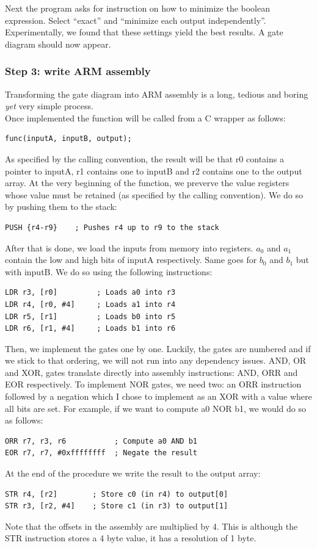 \documentclass{report}
\begin{document}
Next the program asks for instruction on how to minimize the boolean expression. Select ``exact'' and ``minimize each output independently''. Experimentally, we found that these settings yield the best results. A gate diagram should now appear.

\subsubsection*{Step 3: write ARM assembly}
Transforming the gate diagram into ARM assembly is a long, tedious and boring \textit{yet} very simple process.\\
Once implemented the function will be called from a C wrapper as follows:
\begin{verbatim}
func(inputA, inputB, output);
\end{verbatim}
\newpage
As specified by the calling convention, the result will be that r0 contains a pointer to inputA, r1 contains one to inputB and r2 contains one to the output array.
At the very beginning of the function, we preverve the value registers whose value must be retained (as specified by the calling convention). We do so by pushing them to the stack:
\begin{verbatim}
PUSH {r4-r9}    ; Pushes r4 up to r9 to the stack
\end{verbatim}
After that is done, we load the inputs from memory into registers. $a_0$ and $a_1$ contain the low and high bits of inputA respectively. Same goes for $b_0$ and $b_1$ but with inputB. We do so using the following instructions:
\begin{verbatim}
LDR r3, [r0]         ; Loads a0 into r3
LDR r4, [r0, #4]     ; Loads a1 into r4 
LDR r5, [r1]         ; Loads b0 into r5
LDR r6, [r1, #4]     ; Loads b1 into r6
\end{verbatim}
Then, we implement the gates one by one. Luckily, the gates are numbered and if we stick to that ordering, we will not run into any dependency issues. 
AND, OR and XOR, gates translate directly into assembly instructions: AND, ORR and EOR respectively. To implement NOR gates, we need two: an ORR instruction followed by a negation which I chose to implement as an XOR with a value where all bits are set. For example, if we want to compute a0 NOR b1, we would do so as follows:
\begin{verbatim}
ORR r7, r3, r6           ; Compute a0 AND b1
EOR r7, r7, #0xffffffff  ; Negate the result
\end{verbatim}
At the end of the procedure we write the result to the output array:
\begin{verbatim}
STR r4, [r2]        ; Store c0 (in r4) to output[0]
STR r3, [r2, #4]    ; Store c1 (in r3) to output[1]
\end{verbatim}
Note that the offsets in the assembly are multiplied by 4. This is although the STR instruction stores a 4 byte value, it has a resolution of 1 byte.
\end{document}
